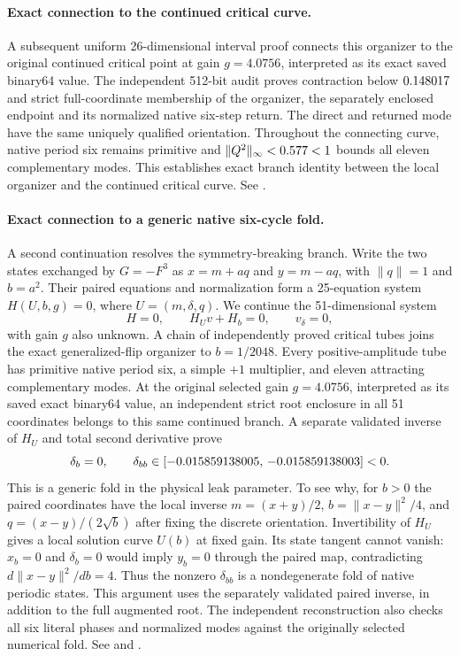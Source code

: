 \documentclass[11pt,letterpaper]{article}
\begin{document}
\paragraph{Exact connection to the continued critical curve.}
A subsequent uniform 26-dimensional interval proof connects this organizer to the
original continued critical point at gain $g=4.0756$, interpreted as its exact saved
binary64 value. The independent 512-bit audit proves contraction below
$0.148017$ and strict full-coordinate membership of the organizer,
the separately enclosed endpoint and its normalized native six-step return.
The direct and returned mode have the same uniquely qualified orientation.
Throughout the connecting curve, native period six remains primitive and
$\|Q^2\|_\infty<0.577<1$ bounds all eleven complementary modes.
This establishes exact branch identity between the local organizer and the
continued critical curve. See .

\paragraph{Exact connection to a generic native six-cycle fold.}
A second continuation resolves the symmetry-breaking branch. Write the two
states exchanged by $G=-F^3$ as $x=m+a q$ and $y=m-a q$, with $\|q\|=1$ and
$b=a^2$. Their paired equations and normalization form a 25-equation system
$H(U,b,g)=0$, where $U=(m,\delta,q)$. We continue the 51-dimensional system
\[
 H=0,\qquad H_Uv+H_b=0,\qquad v_\delta=0,
\]
with gain $g$ also unknown. A chain of \nRNNFoldTubes{} independently proved
critical tubes joins the exact generalized-flip organizer to $b=1/2048$.
Every positive-amplitude tube has primitive native period six, a simple $+1$
multiplier, and eleven attracting complementary modes. At the original
selected gain $g=4.0756$, interpreted as its saved exact binary64 value, an
independent strict root enclosure in all 51 coordinates belongs to this same
continued branch. A separate validated inverse of $H_U$ and total second
derivative prove
\[
 \delta_b=0,\qquad \delta_{bb}\in[-0.015859138005,\,-0.015859138003]<0.
\]
This is a generic fold in the physical leak parameter. To see why, for $b>0$
the paired coordinates have the local inverse
$m=(x+y)/2$, $b=\|x-y\|^2/4$, and $q=(x-y)/(2\sqrt b)$ after fixing the discrete
orientation. Invertibility of $H_U$ gives a local solution curve $U(b)$ at
fixed gain. Its state tangent cannot vanish: $x_b=0$ and $\delta_b=0$ would
imply $y_b=0$ through the paired map, contradicting
$d\|x-y\|^2/db=4$. Thus the nonzero $\delta_{bb}$ is a nondegenerate fold of
native periodic states. This argument uses the separately validated paired
inverse, in addition to the full augmented root. The independent reconstruction
also checks all six literal phases and normalized modes against the originally
selected numerical fold. See
 and
.
\end{document}
